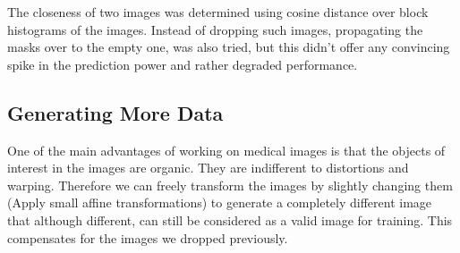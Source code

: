 \documentclass[12pt, a4paper]{article}
\begin{document}
The closeness of two images was determined using cosine distance over block histograms of the images. Instead of dropping such images, propagating the masks over to the empty one, was also tried, but this didn't offer any convincing spike in the prediction power and rather degraded performance.
\subsection{Generating More Data}
One of the main advantages of working on medical images is that the objects of interest in the images are organic. They are indifferent to distortions and warping. Therefore we can freely transform the images by slightly changing them (Apply small affine transformations) to generate a completely different image that although different, can still be considered as a valid image for training. This compensates for the images we dropped previously.
\newpage
\end{document}
